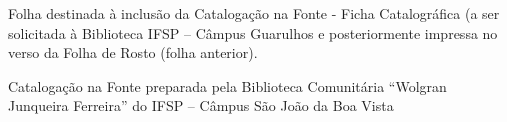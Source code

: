 %
%     

\begin{fichacatalografica}
	
	Folha destinada à inclusão da Catalogação na Fonte - Ficha Catalográfica (a ser solicitada à Biblioteca IFSP – Câmpus Guarulhos e posteriormente impressa no verso da Folha de Rosto (folha anterior).
	
	\vspace{3cm}
	
	\begin{center}
		Catalogação na Fonte preparada pela Biblioteca Comunitária “Wolgran Junqueira Ferreira” do IFSP – Câmpus São João da Boa Vista
	\end{center}
	
	
	\sffamily
	\vspace*{\fill}					%
	\begin{center}					%
	\end{center}
\end{fichacatalografica}